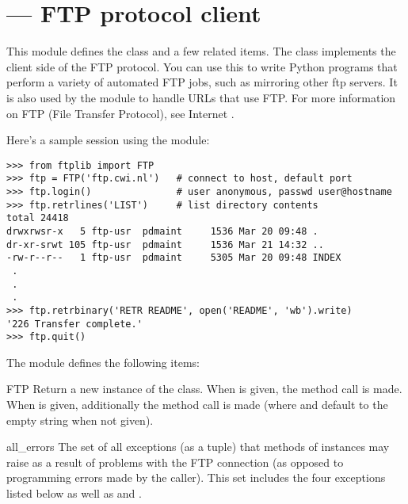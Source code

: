 \section{ ---
         FTP protocol client}



This module defines the class  and a few related items.
The  class implements the client side of the FTP
protocol.  You can use this to write Python
programs that perform a variety of automated FTP jobs, such as
mirroring other ftp servers.  It is also used by the module
 to handle URLs that use FTP.  For more information
on FTP (File Transfer Protocol), see Internet .

Here's a sample session using the  module:

\begin{verbatim}
>>> from ftplib import FTP
>>> ftp = FTP('ftp.cwi.nl')   # connect to host, default port
>>> ftp.login()               # user anonymous, passwd user@hostname
>>> ftp.retrlines('LIST')     # list directory contents
total 24418
drwxrwsr-x   5 ftp-usr  pdmaint     1536 Mar 20 09:48 .
dr-xr-srwt 105 ftp-usr  pdmaint     1536 Mar 21 14:32 ..
-rw-r--r--   1 ftp-usr  pdmaint     5305 Mar 20 09:48 INDEX
 .
 .
 .
>>> ftp.retrbinary('RETR README', open('README', 'wb').write)
'226 Transfer complete.'
>>> ftp.quit()
\end{verbatim}

The module defines the following items:

\begin{classdesc}{FTP}{}
Return a new instance of the  class.  When
 is given, the method call  is
made.  When  is given, additionally the method call
 is made (where
 and  default to the empty string when not given).
\end{classdesc}

\begin{datadesc}{all_errors}
The set of all exceptions (as a tuple) that methods of 
instances may raise as a result of problems with the FTP connection
(as opposed to programming errors made by the caller).  This set
includes the four exceptions listed below as well as
 and .
\end{datadesc}

